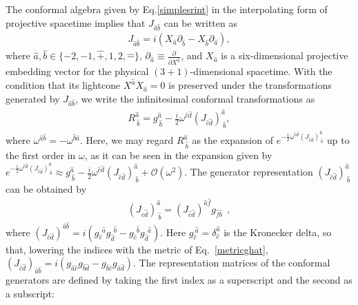 \documentclass[foundations,article,submit,pdftex,moreauthors]{Definitions/mdpi}
\begin{document}
 The conformal algebra given by Eq.\eqref{simplesrint} in the interpolating form of projective spacetime implies that $J_{\hat{a}\hat{b}}$ can be written as
\begin{align}
    J_{\hat{a}\hat{b}}=i(X_{\hat{a}}\partial_{\hat{b}}-X_{\hat{b}}\partial_{\hat{a}}),
\end{align}
where $\hat{a},\hat{b}\in\{-2,-1,\hat{+},1,2,\hat{-}\}$, $\partial_{\hat{a}}\equiv\frac{\partial}{\partial X^{\hat{a}}}$, and $X_{\hat{a}}$ is a six-dimensional projective embedding vector for the physical $(3+1)$-dimensional spacetime. With the condition that its lightcone 
$X^{\hat{a}}X_{\hat{a}}=0$
is preserved under the transformations generated by $J_{\hat{a}\hat{b}}$, we write the infinitesimal conformal transformations as
\begin{align}
R^{\hat{a}}_{~\hat{b}}=g^{\hat{a}}_{~\hat{b}}-\frac{i}{2}\omega^{\hat{c}\hat{d}}(J_{\hat{c}\hat{d}})^{\hat{a}}_{~\hat{b}},\label{R_conformalTransformations}
\end{align}
where $\omega^{\hat{a}\hat{b}}=-\omega^{\hat{b}\hat{a}}$. Here, we may regard $R^{\hat{a}}_{~\hat{b}}$ as the expansion of $e^{-\frac{i}{2}\omega^{\hat{c}\hat{d}}(J_{\hat{c}\hat{d}})^{\hat{a}}_{~\hat{b}}}$ up to the first order in $\omega$, as it can be seen in the expansion given by 
$e^{-\frac{i}{2}\omega^{\hat{c}\hat{d}}(J_{\hat{c}\hat{d}})^{\hat{a}}_{~\hat{b}}} \approx  g^{\hat{a}}_{~\hat{b}}-\frac{i}{2}\omega^{\hat{c}\hat{d}}(J_{\hat{c}\hat{d}})^{\hat{a}}_{~\hat{b}}+\mathcal{O}(\omega^2)$.
The generator representation $(J_{\hat{c}\hat{d}})^{\hat{a}}_{~\hat{b}}$ can be obtained by
\begin{align}
    (J_{\hat{c}\hat{d}})^{\hat{a}}_{~\hat{b}}=(J_{\hat{c}\hat{d}})^{\hat{a}\hat{f}}g_{\hat{f}\hat{b}}~~,
\end{align}
where $(J_{{\hat{c}}{\hat{d}}})^{{\hat{a}}{\hat{b}}}=i(g_{\hat{c}}^{~~\hat{a}} g_{\hat{d}}^{~~\hat{b}}-g_{\hat{c}}^{~~\hat{b}} g_{\hat{d}}^{~~\hat{a}})$. {Here $g_{\hat{c}}^{~\hat{a}}=\delta_{\hat{c}}^{\hat{a}}$ is the Kronecker delta, so that, lowering the indices with the metric of Eq.~\eqref{metricghat}, $(J_{\hat{c}\hat{d}})_{\hat{a}\hat{b}}=i(g_{\hat{a}\hat{c}}g_{\hat{b}\hat{d}}-g_{\hat{b}\hat{c}}g_{\hat{a}\hat{d}})$.} The representation matrices of the conformal generators are defined by taking the first index as a superscript and the second as a subscript:
\end{document}
